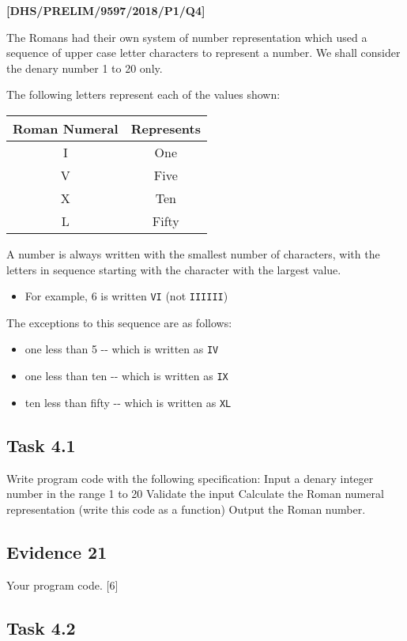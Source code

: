 \item \textbf{{[}DHS/PRELIM/9597/2018/P1/Q4{]} }

The Romans had their own system of number representation which used
a sequence of upper case letter characters to represent a number.
We shall consider the denary number 1 to 20 only. 

The following letters represent each of the values shown: 
\noindent \begin{center}
\begin{tabular}{|c|c|}
\hline 
Roman Numeral  & Represents\tabularnewline
\hline 
I & One\tabularnewline
\hline 
V & Five\tabularnewline
\hline 
X & Ten\tabularnewline
\hline 
L & Fifty\tabularnewline
\hline 
\end{tabular}
\par\end{center}

A number is always written with the smallest number of characters,
with the letters in sequence starting with the character with the
largest value. 
\begin{itemize}
\item For example, 6 is written \texttt{VI} (not \texttt{IIIIII}) 
\end{itemize}
The exceptions to this sequence are as follows: 
\begin{itemize}
\item one less than 5 -{}- which is written as \texttt{IV}
\item one less than ten -{}- which is written as \texttt{IX} 
\item ten less than fifty -{}- which is written as \texttt{XL} 
\end{itemize}

\subsection*{Task 4.1}

Write program code with the following specification: Input a denary
integer number in the range 1 to 20 Validate the input Calculate the
Roman numeral representation (write this code as a function) Output
the Roman number. 

\subsection*{Evidence 21 }

Your program code. \hfill{}{[}6{]}

\subsection*{Task 4.2 }


